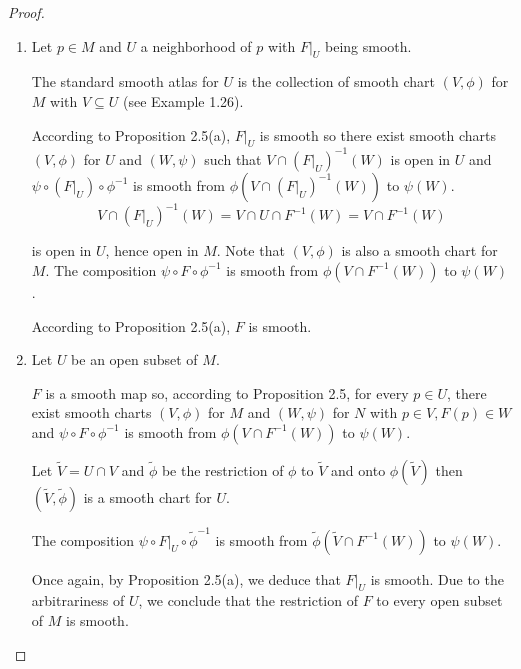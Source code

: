 \begin{proof}
    \begin{enumerate}[itemsep=0pt,label={(\alph*)}]
        \item Let \( p \in M \) and \( U \) a neighborhood of \( p \) with \( F\vert_{U} \) being smooth.

              The standard smooth atlas for \( U \) is the collection of smooth chart \( (V, \phi) \) for \( M \) with \( V \subseteq U \) (see Example 1.26).

              According to Proposition 2.5(a), \( F\vert_{U} \) is smooth so there exist smooth charts \( (V, \phi) \) for \( U \) and \( (W, \psi) \) such that \( V \cap {(F\vert_{U})}^{-1}(W) \) is open in \( U \) and \( \psi \circ {(F\vert_{U})} \circ \phi^{-1} \) is smooth from \( \phi(V \cap {(F\vert_{U})}^{-1}(W)) \) to \( \psi(W) \).
              \[
                  V \cap {(F\vert_{U})}^{-1}(W) = V \cap U \cap F^{-1}(W) = V \cap F^{-1}(W)
              \]

              is open in \( U \), hence open in \( M \). Note that \( (V, \phi) \) is also a smooth chart for \( M \). The composition \( \psi \circ F \circ \phi^{-1} \) is smooth from \( \phi(V \cap F^{-1}(W)) \) to \( \psi(W) \).

              According to Proposition 2.5(a), \( F \) is smooth.
        \item Let \( U \) be an open subset of \( M \).

              \( F \) is a smooth map so, according to Proposition 2.5, for every \( p \in U \), there exist smooth charts \( (V, \phi) \) for \( M \) and \( (W, \psi) \) for \( N \) with \( p \in V, F(p) \in W \) and \( \psi \circ F \circ \phi^{-1} \) is smooth from \( \phi(V \cap F^{-1}(W)) \) to \( \psi(W) \).

              Let \( \widetilde{V} = U \cap V \) and \( \widetilde{\phi} \) be the restriction of \( \phi \) to \( \widetilde{V} \) and onto \( \phi(\widetilde{V}) \) then \( (\widetilde{V}, \widetilde{\phi}) \) is a smooth chart for \( U \).

              The composition \( \psi \circ F\vert_{U} \circ \widetilde{\phi}^{-1} \) is smooth from \( \widetilde{\phi}(\widetilde{V} \cap F^{-1}(W)) \) to \( \psi(W) \).

              Once again, by Proposition 2.5(a), we deduce that \( F\vert_{U} \) is smooth. Due to the arbitrariness of \( U \), we conclude that the restriction of \( F \) to every open subset of \( M \) is smooth.
    \end{enumerate}
\end{proof}

